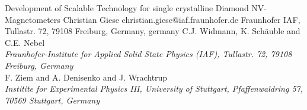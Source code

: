 \begin{conf-abstract}[]
{Development of Scalable Technology for single crystalline Diamond NV-Magnetometers}
{\color{blue} Christian Giese}
{christian.giese@iaf.fraunhofer.de}
{Fraunhofer IAF, Tullastr. 72, 79108 Freiburg, Germany, germany}
{{\color{blue}C.J. Widmann, K. Schäuble and C.E. Nebel}\\ \textit{Fraunhofer-Institute for Applied Solid State Physics (IAF), Tullastr. 72, 79108 Freiburg, Germany}\\ 
{\color{blue}F. Ziem and A. Denisenko and J. Wrachtrup}\\ \textit{ Institite for Experimental Physics III, University of Stuttgart, Pfaffenwaldring 57, 70569 Stuttgart, Germany}\\ 
\decofourleft \decofourright}





\printbibliography[heading=none]

\end{conf-abstract}
